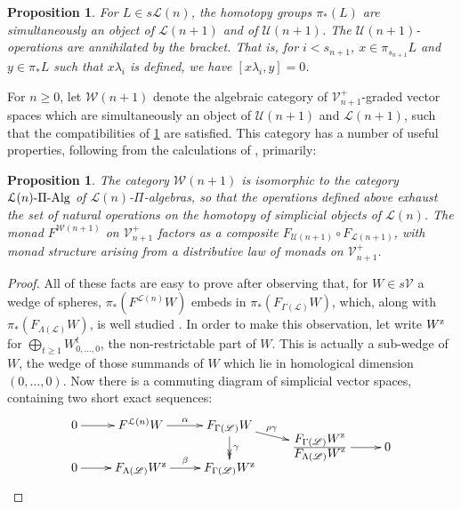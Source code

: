 \documentclass[11pt]{amsart}
\theoremstyle{plain}
\newtheorem{prop}[thm]{Proposition}
\theoremstyle{definition}
\newcommand{\scrL}{\mathscr{L}}
\newcommand{\calU}{\mathcal{U}}
\newcommand{\calL}{\mathcal{L}}
\newcommand{\calV}{\mathcal{V}}
\newcommand{\calw}{\mathcal{W}}
\theoremstyle{plain}
\newcommand{\LieOperad}{{\scrL}}
\newcommand{\vect}[2]{\calV^{#1}_{#2}}
\newcommand{\PiAlg}{\textup{-$\Pi$-Alg}}
\begin{document}
\begin{homotopy operations for PRLs}
\begin{prop}\label{compatibilities between U and L in W}
For $L\in s\calL(n)$, the homotopy groups $\pi_*(L)$ are simultaneously an object of $\calL(n+1)$ and of $\calU(n+1)$. The $\calU(n+1)$-operations are annihilated by the bracket. That is, for $i<s_{n+1}$, $x\in\pi_{s_{n+1}}L$ and $y\in \pi_*L$ such that $x\lambda_i$ is defined, we have $[x\lambda_i,y]=0$.
\end{prop}
For $n\geq0$, let $\calw(n+1)$ denote the algebraic category of $\vect{+}{n+1}$-graded vector spaces which are simultaneously an object of $\calU(n+1)$ and $\calL(n+1)$, such that the compatibilities of \ref{compatibilities between U and L in W} are satisfied. This category has a number of useful properties, following from the calculations of \cite{6Author.pdf}, primarily:
\begin{prop}\label{prop on Wnplus1 being the pialgs for Wn}
The category $\calw(n+1)$ is isomorphic to the category $\calL(n)\PiAlg$ of $\calL(n)$-$\Pi$-algebras, so that the operations defined above exhaust the set of natural operations on the homotopy of simplicial objects of $\calL(n)$.
The monad $F^{\calw(n+1)}$ on $\vect{+}{n+1}$ factors as a composite $F_{\calU(n+1)}\circ F_{\calL(n+1)}$, with monad structure arising from a distributive law \cite{BeckDistLaws} of monads on $\vect{+}{n+1}$.
\end{prop}
\begin{proof}
All of these facts are easy to prove after observing that, for $W\in s\calV$ a wedge of spheres, $\pi_*(F^{\calL(n)}W)$ embeds in $\pi_*(F_{\Gamma(\LieOperad)}W)$, which, along with $\pi_*(F_{\Lambda(\LieOperad)}W)$, is well studied \cite{6Author.pdf}. In order to make this observation, let write $W^\textup{z}$ for $\bigoplus_{t\geq1}W_{0,\ldots,0}^t$, the non-restrictable part of $W$. This is actually a sub-wedge of $W$, the wedge of those summands of $W$ which lie in homological dimension $(0,\ldots,0)$. Now there is a commuting diagram of simplicial vector spaces, containing two short exact sequences:
\[\xymatrix@R=-2mm{
0
\ar[r]
&%
F^{\calL(n)}W
\ar[r]^{\alpha}
&%
F_{\Gamma(\LieOperad)}W
\ar[dr]^-(.4){\rho\gamma}\ar@{->>}[dd]^-{\gamma}
&%
\\%
&&&\frac{\displaystyle F_{\Gamma(\LieOperad)}W^\textup{z}}{\displaystyle F_{\Lambda(\LieOperad)}W^\textup{z}}
\ar[r]
&
0
\\
0
\ar[r]
&%
F_{\Lambda(\LieOperad)}W^\textup{z}
\ar[r]^{\beta}
&%
F_{\Gamma(\LieOperad)}W^\textup{z}
}\]
\end{proof}
\end{homotopy operations for PRLs}
\end{document}

